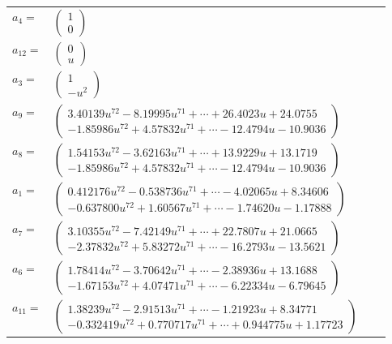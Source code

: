 \documentclass[1p]{elsarticle_modified}
\theoremstyle{definition}
\begin{document}
\begin{tabular}{m{7pt} m{180pt} m{7pt} m{180pt} }
\flushright $a_{4}=$&$\begin{pmatrix}1\\0\end{pmatrix}$ \\
\flushright $a_{12}=$&$\begin{pmatrix}0\\u\end{pmatrix}$ \\
\flushright $a_{3}=$&$\begin{pmatrix}1\\- u^2\end{pmatrix}$ \\
\flushright $a_{9}=$&$\begin{pmatrix}3.40139 u^{72}-8.19995 u^{71}+\cdots+26.4023 u+24.0755\\-1.85986 u^{72}+4.57832 u^{71}+\cdots-12.4794 u-10.9036\end{pmatrix}$ \\
\flushright $a_{8}=$&$\begin{pmatrix}1.54153 u^{72}-3.62163 u^{71}+\cdots+13.9229 u+13.1719\\-1.85986 u^{72}+4.57832 u^{71}+\cdots-12.4794 u-10.9036\end{pmatrix}$ \\
\flushright $a_{1}=$&$\begin{pmatrix}0.412176 u^{72}-0.538736 u^{71}+\cdots-4.02065 u+8.34606\\-0.637800 u^{72}+1.60567 u^{71}+\cdots-1.74620 u-1.17888\end{pmatrix}$ \\
\flushright $a_{7}=$&$\begin{pmatrix}3.10355 u^{72}-7.42149 u^{71}+\cdots+22.7807 u+21.0665\\-2.37832 u^{72}+5.83272 u^{71}+\cdots-16.2793 u-13.5621\end{pmatrix}$ \\
\flushright $a_{6}=$&$\begin{pmatrix}1.78414 u^{72}-3.70642 u^{71}+\cdots-2.38936 u+13.1688\\-1.67153 u^{72}+4.07471 u^{71}+\cdots-6.22334 u-6.79645\end{pmatrix}$ \\
\flushright $a_{11}=$&$\begin{pmatrix}1.38239 u^{72}-2.91513 u^{71}+\cdots-1.21923 u+8.34771\\-0.332419 u^{72}+0.770717 u^{71}+\cdots+0.944775 u+1.17723\end{pmatrix}$ \\

\end{tabular}
\end{document}

